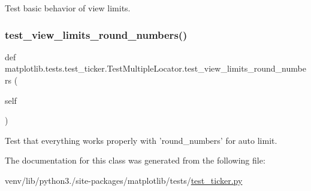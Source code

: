 \begin{DoxyVerb}Test basic behavior of view limits.
\end{DoxyVerb}
 \mbox{\label{classmatplotlib_1_1tests_1_1test__ticker_1_1TestMultipleLocator_a2a0828691bc2a8d50c6c5e0d8a8c8998}} 
\subsubsection{\texorpdfstring{test\+\_\+view\+\_\+limits\+\_\+round\+\_\+numbers()}{test\_view\_limits\_round\_numbers()}}
{\footnotesize\ttfamily def matplotlib.\+tests.\+test\+\_\+ticker.\+Test\+Multiple\+Locator.\+test\+\_\+view\+\_\+limits\+\_\+round\+\_\+numbers (\begin{DoxyParamCaption}\item[{}]{self }\end{DoxyParamCaption})}

\begin{DoxyVerb}Test that everything works properly with 'round_numbers' for auto
limit.
\end{DoxyVerb}
 

The documentation for this class was generated from the following file\+:\begin{DoxyCompactItemize}
\item 
venv/lib/python3./site-\/packages/matplotlib/tests/\hyperlink{test__ticker_8py}{test\+\_\+ticker.\+py}\end{DoxyCompactItemize}
